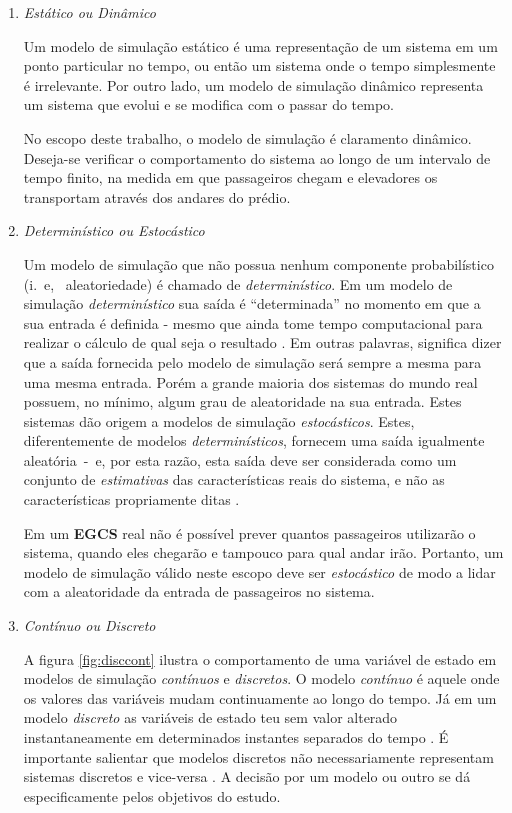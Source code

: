 \begin{enumerate}
\item \textit{Estático ou Dinâmico}

Um modelo de simulação estático é uma representação de um sistema em um ponto
particular no tempo, ou então um sistema onde o tempo simplesmente é
irrelevante. Por outro lado, um modelo de simulação dinâmico representa um
sistema que evolui e se modifica com o passar do tempo.

No escopo deste trabalho, o modelo de simulação é claramento dinâmico. Deseja-se
verificar o comportamento do sistema ao longo de um intervalo de tempo finito,
na medida em que passageiros chegam e elevadores os transportam através dos
andares do prédio.

\item \textit{Determinístico ou Estocástico}

Um modelo de simulação que não possua nenhum componente probabilístico (i.~e,~
aleatoriedade) é chamado de \textit{determinístico}. Em um modelo de simulação
\textit{determinístico} sua saída é ``determinada'' no momento em que a sua
entrada é definida - mesmo que ainda tome tempo computacional para realizar o
cálculo de qual seja o resultado \cite{Law}. Em outras palavras, significa dizer
que a saída fornecida pelo modelo de simulação será sempre a mesma para uma
mesma entrada. Porém a grande maioria dos sistemas do mundo real possuem, no
mínimo, algum grau de aleatoridade na sua entrada. Estes sistemas dão origem a
modelos de simulação \textit{estocásticos}. Estes, diferentemente de modelos
\textit{determinísticos}, fornecem uma saída igualmente aleatória~-~e, por esta
razão, esta saída deve ser considerada como um conjunto de \textit{estimativas}
das características reais do sistema, e não as características propriamente
ditas \cite{Banks}.

Em um \textbf{EGCS} real não é possível prever quantos passageiros utilizarão o
sistema, quando eles chegarão e tampouco para qual andar irão. Portanto, um
modelo de simulação válido neste escopo deve ser \textit{estocástico} de modo a
lidar com a aleatoridade da entrada de passageiros no sistema.

\item \textit{Contínuo ou Discreto}

A figura \ref{fig:disccont} ilustra o comportamento de uma variável de estado em
modelos de simulação \textit{contínuos} e \textit{discretos}. O modelo
\textit{contínuo} é aquele onde os valores das variáveis mudam continuamente ao
longo do tempo. Já em um modelo \textit{discreto} as variáveis de estado teu sem
valor alterado instantaneamente em determinados instantes separados do tempo
\cite{Banks}. É importante salientar que modelos discretos não necessariamente
representam sistemas discretos e vice-versa \cite{Law}. A decisão por um modelo
ou outro se dá especificamente pelos objetivos do estudo.


\end{enumerate}
